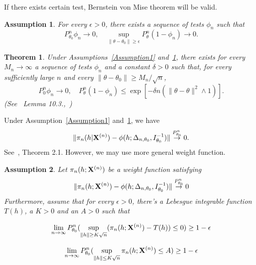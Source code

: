 \documentclass[3p]{elsarticle}
\theoremstyle{plain}
\newtheorem{theorem}{\quad\quad Theorem}
\newtheorem{assumption}{\quad\quad Assumption}
\theoremstyle{definition}
\theoremstyle{remark}
\begin{document}
If there exists certain test, Bernstein von Mise theorem will be valid.
\begin{assumption}\label{Assumption2}
    For every $\epsilon>0$, there exists a sequence of tests $\phi_n$ such that
        \begin{equation}
            P_{\theta_0}^n\phi_n\to 0,\quad \sup_{\|\theta-\theta_0\|\geq \epsilon} P_\theta^n(1-\phi_n)\to 0.
        \end{equation}
\end{assumption}
\begin{theorem}\label{Thm:someTest}
    Under Assumptions~\ref{Assumption1} and~\ref{Assumption2},
    there exists for every $M_n\to \infty$ a sequence of tests $\phi_n$ and a constant $\delta>0$ such that, for every sufficiently large $n$ and every $\|\theta-\theta_0\|\geq M_n/\sqrt{n}$,
    $$
    P^n_{0} \phi_n\to 0,\quad
    P^n_{\theta} (1-\phi_n)\leq \exp[-\delta n(\|\theta-\theta\|^2\wedge 1)].
    $$
    (See~\cite{van2000asymptotic} Lemma 10.3.,~\cite{Kleijn2012The})
\end{theorem}
Under Assumption~\ref{Assumption1} and~\ref{Assumption2}, we have 
$$
            \|\pi_n(h|\mathbf{X}^{(n)})-\phi(h;\Delta_{n,\theta_0},I_{\theta_0}^{-1})\|\overset{P_{\theta_0}^n}{\to}0.
$$
See~\cite{Kleijn2012The}, Theorem 2.1.
However, we may use more general weight function.
        
\begin{assumption}\label{Assumption3}
    Let $\pi_n(h;\mathbf{X}^{(n)})$ be a weight function satisfying 
        \begin{equation}\label{vonMisesResults}
            \|\pi_n(h;\mathbf{X}^{(n)})-\phi(h;\Delta_{n,\theta_0},I_{\theta_0}^{-1})\|\overset{P_{\theta_0}^n}{\to}0
        \end{equation}
Furthermore, assume that for every $\epsilon>0$, there's a Lebesgue integrable function $T(h)$, a $K>0$ and an $A>0$ such that 

    \begin{equation}\label{Assump31}
        \lim_{n\to \infty}P_{\theta_0}^n(\sup_{\|h\|\geq K\sqrt{n}}(\pi_n(h;\mathbf{X}^{(n)})-T(h))\leq 0)\geq 1-\epsilon
\end{equation}

        \begin{equation}\label{Assump32}
            \lim_{n\to \infty} P_{\theta_0}^n(\sup_{\|h\|\leq K\sqrt{n}} \pi_n(h;\mathbf{X}^{(n)})\leq A)\geq 1-\epsilon
        \end{equation}
\end{assumption}
\end{document}
